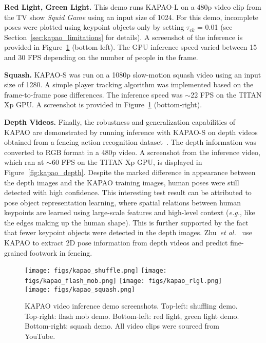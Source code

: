 \documentclass[runningheads]{llncs}
\newcommand{\etal}{\textit{et al.}}
\newcommand{\eg}{\textit{e.g.}}
\begin{document}
\medskip\noindent\textbf{Red Light, Green Light.} This demo runs KAPAO-L on a 480p video clip from the TV show \textit{Squid Game} using an input size of 1024. For this demo, incomplete poses were plotted using keypoint objects only by setting $\tau_{ck}$ = 0.01 (see Section~\ref{sec:kapao_limitations} for details). A screenshot of the inference is provided in Figure~\ref{fig:kapao_demos} (bottom-left). The GPU inference speed varied between 15 and 30 FPS depending on the number of people in the frame. 

\medskip\noindent\textbf{Squash.} KAPAO-S was run on a 1080p slow-motion squash video using an input size of 1280. A simple player tracking algorithm was implemented based on the frame-to-frame pose differences. The inference speed was $\sim$22 FPS on the TITAN Xp GPU. A screenshot is provided in Figure~\ref{fig:kapao_demos} (bottom-right).

\medskip\noindent\textbf{Depth Videos.} Finally, the robustness and generalization capabilities of KAPAO are demonstrated by running inference with KAPAO-S on depth videos obtained from a fencing action recognition dataset~\cite{app_malawski2016classification}. The depth information was converted to RGB format in a 480p video. A screenshot from the inference video, which ran at $\sim$60 FPS on the TITAN Xp GPU, is displayed in Figure~\ref{fig:kapao_depth}. Despite the marked difference in appearance between the depth images and the KAPAO training images, human poses were still detected with high confidence. This interesting test result can be attributed to pose object representation learning, where spatial relations between human keypoints are learned using large-scale features and high-level context (\eg, like the edges making up the human shape). This is further supported by the fact that fewer keypoint objects were detected in the depth images. Zhu~\etal~\cite{app_zhu2022fencenet} use KAPAO to extract 2D pose information from depth videos and predict fine-grained footwork in fencing. 

\begin{figure}
\centering
    \texttt{[image: figs/kapao\_shuffle.png]}
    \texttt{[image: figs/kapao\_flash\_mob.png]}
    \texttt{[image: figs/kapao\_rlgl.png]}
    \texttt{[image: figs/kapao\_squash.png]}
\caption[KAPAO video inference screenshots.]{KAPAO video inference demo screenshots. Top-left: shuffling demo. Top-right: flash mob demo. Bottom-left: red light, green light demo. Bottom-right: squash demo. All video clips were sourced from YouTube.}
\label{fig:kapao_demos}
\end{figure}
\end{document}
